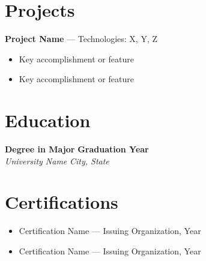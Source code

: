 \documentclass[11pt,a4paper]{article}
\begin{document}
\section{Projects}

\textbf{Project Name} --- Technologies: X, Y, Z
\begin{itemize}
    \item Key accomplishment or feature
    \item Key accomplishment or feature
\end{itemize}

\section{Education}

\textbf{Degree in Major} \hfill \textbf{Graduation Year} \\
\textit{University Name} \hfill \textit{City, State}

\section{Certifications}
\begin{itemize}
    \item Certification Name --- Issuing Organization, Year
    \item Certification Name --- Issuing Organization, Year
\end{itemize}
\end{document}
